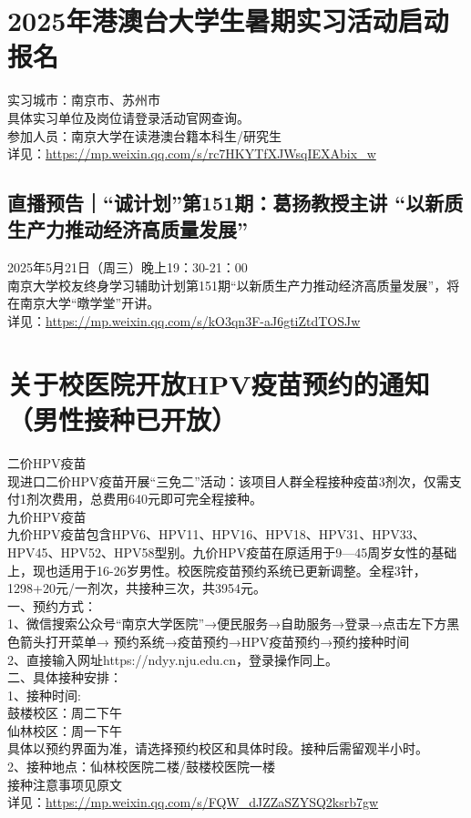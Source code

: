 \documentclass[letterpaper, 12pt]{article}
\begin{document}
\begin{multicols}{2}
\section{2025年港澳台大学生暑期实习活动启动报名} %
实习城市：南京市、苏州市
\\具体实习单位及岗位请登录活动官网查询。
\\参加人员：南京大学在读港澳台籍本科生/研究生
\\详见：\url{https://mp.weixin.qq.com/s/rc7HKYTfXJWsqIEXAbix_w}

\subsection{直播预告｜“诚计划”第151期：葛扬教授主讲 “以新质生产力推动经济高质量发展”} %
2025年5月21日（周三）晚上19：30-21：00
\\南京大学校友终身学习辅助计划第151期“以新质生产力推动经济高质量发展”，将在南京大学“暾学堂”开讲。
\\详见：\url{https://mp.weixin.qq.com/s/kO3qn3F-aJ6gtiZtdTOSJw}

\section{关于校医院开放HPV疫苗预约的通知（男性接种已开放）} %
二价HPV疫苗
\\现进口二价HPV疫苗开展“三免二”活动：该项目人群全程接种疫苗3剂次，仅需支付1剂次费用，总费用640元即可完全程接种。
\\九价HPV疫苗
\\     九价HPV疫苗包含HPV6、HPV11、HPV16、HPV18、HPV31、HPV33、HPV45、HPV52、HPV58型别。九价HPV疫苗在原适用于9—45周岁女性的基础上，现也适用于16-26岁男性。校医院疫苗预约系统已更新调整。全程3针，1298+20元/一剂次，共接种三次，共3954元。
\\一、预约方式：
\\1、微信搜索公众号“南京大学医院”→便民服务→自助服务→登录→点击左下方黑色箭头打开菜单→ 预约系统→疫苗预约→HPV疫苗预约→预约接种时间
\\2、直接输入网址https://ndyy.nju.edu.cn，登录操作同上。
\\二、具体接种安排：
\\1、接种时间:
\\鼓楼校区：周二下午
\\仙林校区：周一下午
\\具体以预约界面为准，请选择预约校区和具体时段。接种后需留观半小时。
\\2、接种地点：仙林校医院二楼/鼓楼校医院一楼
\\接种注意事项见原文
\\详见：\url{https://mp.weixin.qq.com/s/FQW_dJZZaSZYSQ2ksrb7gw}


\end{multicols}
\end{document}
